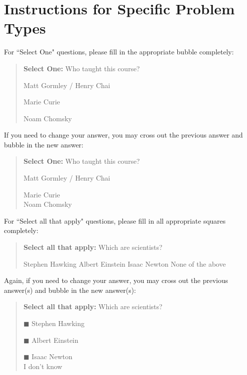\documentclass[11pt,addpoints,answers]{exam}
\begin{document}
\section*{Instructions for Specific Problem Types}

For ``Select One" questions, please fill in the appropriate bubble completely:

\begin{quote}
\textbf{Select One:} Who taught this course?
\begin{list}{}
     \item\CIRCLE{} Matt Gormley / Henry Chai
     \item\Circle{} Marie Curie
     \item\Circle{} Noam Chomsky
\end{list}
\end{quote}


If you need to change your answer, you may cross out the previous answer and bubble in the new answer:

\begin{quote}
\textbf{Select One:} Who taught this course?
\begin{list}{}
     \item\CIRCLE{} Matt Gormley / Henry Chai
     \item\Circle{} Marie Curie\\
     \xcancel{\CIRCLE}{} Noam Chomsky
\end{list}
\end{quote}


For ``Select all that apply" questions, please fill in all appropriate squares completely:

\begin{quote}
\textbf{Select all that apply:} Which are scientists?
{
    \checkboxchar{$\Box$} \checkedchar{$\blacksquare$}
    \begin{checkboxes}
     \choice Stephen Hawking 
     \CorrectChoice Albert Einstein
     \choice Isaac Newton
     \choice None of the above
    \end{checkboxes}
    }
\end{quote}

Again, if you need to change your answer, you may cross out the previous answer(s) and bubble in the new answer(s):

\begin{quote}
\textbf{Select all that apply:} Which are scientists?
    \begin{list}{}
    \item $\blacksquare$ Stephen Hawking 
    \item $\blacksquare$ Albert Einstein
    \item $\blacksquare$ Isaac Newton\\
    \xcancel{$\blacksquare$} I don't know
\end{list}
\end{quote}
\end{document}
